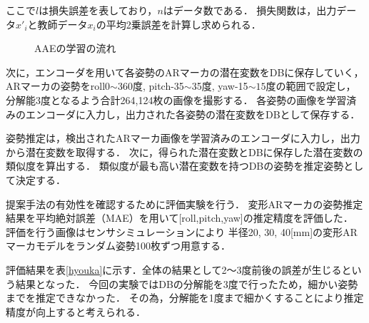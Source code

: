 \documentclass{jsarticle}
\begin{document}
ここで$l$は損失誤差を表しており，$n$はデータ数である．
損失関数は，出力データ$x'_i$と教師データ$x_i$の平均2乗誤差を計算し求められる．

\begin{figure}[ht]
\vspace{-1zh}
\setlength{\epsfxsize}{6.5cm}
\centerline{}
\vspace{0zh}
\caption{AAEの学習の流れ}
\label{BB}
\vspace{-2zh}
\end{figure}


次に，エンコーダを用いて各姿勢のARマーカの潜在変数をDBに保存していく，
ARマーカの姿勢をroll0$\sim$360度, pitch-35$\sim$35度, yaw-15$\sim15$度の範囲で設定し，
分解能3度となるよう合計264,124枚の画像を撮影する．
各姿勢の画像を学習済みのエンコーダに入力し，出力された各姿勢の潜在変数をDBとして保存する．

姿勢推定は，検出されたARマーカ画像を学習済みのエンコーダに入力し，出力から潜在変数を取得する．
次に，得られた潜在変数とDBに保存した潜在変数の類似度を算出する．
類似度が最も高い潜在変数を持つDBの姿勢を推定姿勢として決定する．








提案手法の有効性を確認するために評価実験を行う．
変形ARマーカの姿勢推定結果を平均絶対誤差（MAE）を用いて[roll,pitch,yaw]の推定精度を評価した．
評価を行う画像はセンサシミュレーションにより	
半径20, 30, 40[mm]の変形ARマーカモデルをランダム姿勢100枚ずつ用意する．

評価結果を表\ref{hyouka}に示す．全体の結果として2～3度前後の誤差が生じるという結果となった．
今回の実験ではDBの分解能を3度で行ったため，細かい姿勢までを推定できなかった．
その為，分解能を1度まで細かくすることにより推定精度が向上すると考えられる．
\end{document}
